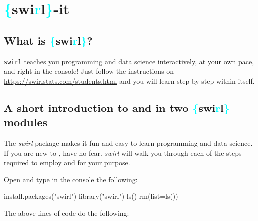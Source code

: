 
\chapter{\textcolor{cyan}{\{}swi\textcolor{cyan}{r}l\textcolor{cyan}{\}}-it}


\section{What is \textcolor{cyan}{\{}swi\textcolor{cyan}{r}l\textcolor{cyan}{\}}?}

\texttt{swirl} teaches you \R programming and data science interactively, at your own pace, and right in the \R console!
Just follow the instructions on \websmall\url{https://swirlstats.com/students.html} and you will learn \R step by step within \Rstudio itself.

\section{A short introduction to \R and \Rstudio in two \textcolor{cyan}{\{}swi\textcolor{cyan}{r}l\textcolor{cyan}{\}} modules}\label{exe:swirl}
The \textit{swirl} \R package makes it fun and easy to learn \R programming and data science. If you are new to \R, have no fear. \textit{swirl} will walk you through each of the steps required to employ \Rstudio and \R for your purpose.

Open \Rstudio  and type in the console the following:

\begin{rblock1}
	install.packages("swirl")
	library("swirl")
	ls()
	rm(list=ls())
\end{rblock1}

The above lines of code do the following:

